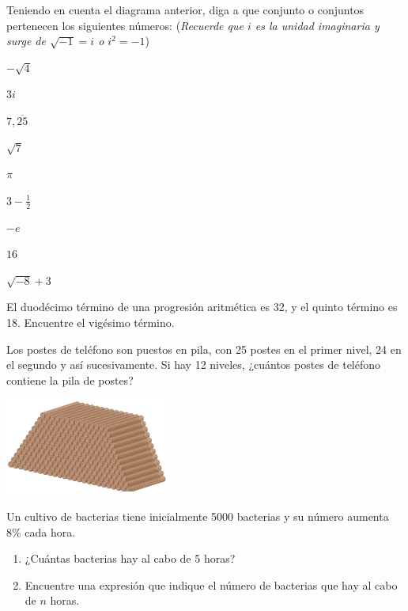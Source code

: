 \documentclass[letterpaper,fleqn]{article}
\begin{document}
\begin{enumerate}
\item Teniendo en cuenta el diagrama anterior, diga a que conjunto o conjuntos pertenecen los siguientes números: (\emph{Recuerde que $i$ es la unidad imaginaria y surge de $\sqrt{-1}=i$ \quad o \quad $i^{2}=-1$})
\begin{enumerate}
\begin{multicols}{2}
\item $-\sqrt{4}$
\item $3i$
\item $7,\overline{25}$
\item $\sqrt{7}$
\item $\pi$
\item $3-\frac{1}{2}$
\item $-e$
\item $16$
\item $\sqrt{-8}+3$
\end{multicols}
\end{enumerate}
 \item El duodécimo término de una progresión aritmética es 32, y el quinto término es 18. Encuentre el vigésimo término.\noanswer
\begin{minipage}{.45\textwidth}
\item Los postes de teléfono son puestos en pila, con 25 postes en el primer nivel, 24 en el segundo y así sucesivamente. Si hay 12 niveles, ¿cuántos postes de teléfono contiene la pila de postes?
\end{minipage}\hfill
\begin{minipage}{.45\textwidth}
\includegraphics[scale=.9]{Images/postes.png} 
\end{minipage}
\noanswer
\item Un cultivo de bacterias tiene inicialmente 5000 bacterias y su número aumenta 8\% cada hora. 
\begin{enumerate}
\item ¿Cuántas bacterias hay al cabo de 5 horas?\noanswer
\item Encuentre una expresi\'{o}n que indique el n\'{u}mero de bacterias que hay al cabo de $n$ horas.\noanswer
\end{enumerate}

\end{enumerate}
\end{document}
